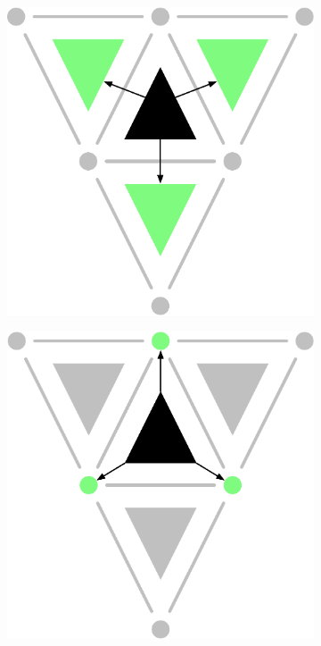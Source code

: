 \begin{figure}
\centering
\begin{subfigure}[b]{0.27\linewidth}
\includegraphics[width=\linewidth]{figs/2-simplex-adjacency}
\caption{}%
\label{subfig:2-simplex-adjacency}
\end{subfigure}
\quad
\begin{subfigure}[b]{0.27\linewidth}
\includegraphics[width=\linewidth]{figs/2-simplex-vertices}

\end{subfigure}
\end{figure}
